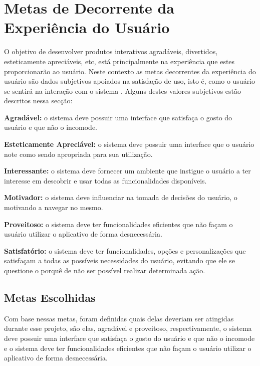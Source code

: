\chapter[Metas Decorrente da Experiência do Usuário]{Metas de Decorrente da Experiência do Usuário}

O objetivo de desenvolver produtos interativos agradáveis, divertidos, esteticamente apreciáveis, etc, está principalmente na experiência que estes proporcionarão ao usuário. Neste contexto as metas decorrentes da experiência do usuário são dados subjetivos apoiados na satisfação de uso,  isto é, como o usuário se sentirá na interação com o sistema \cite{SHROPR}. Alguns destes valores subjetivos estão descritos nessa secção:

\hspace{1.3cm}
\textbf{Agradável:} o sistema deve possuir uma interface que satisfaça o gosto do usuário e que não o incomode.

\hspace{1.3cm}
\textbf{Esteticamente Apreciável:} o sistema deve possuir uma interface que o usuário note como sendo apropriada para sua utilização.

\hspace{1.3cm}
\textbf{Interessante:} o sistema deve fornecer um ambiente que instigue o usuário a ter interesse em descobrir e usar todas as funcionalidades disponíveis.

\hspace{1.3cm}
\textbf{Motivador:} o sistema deve influenciar na tomada de decisões do usuário, o motivando a navegar no mesmo.

\hspace{1.3cm}
\textbf{Proveitoso:} o sistema deve ter funcionalidades eficientes que não façam o usuário utilizar o aplicativo de forma desnecessária.

\hspace{1.3cm}
\textbf{Satisfatório:} o sistema deve ter funcionalidades, opções e personalizações que satisfaçam a todas as possíveis necessidades do usuário, evitando que ele se questione o porquê de não ser possível realizar determinada ação.

\section{Metas Escolhidas}

Com base nessas metas, foram definidas quais delas deveriam ser atingidas durante esse projeto, são elas, agradável e proveitoso, respectivamente, o sistema deve possuir uma interface que satisfaça o gosto do usuário e que não o incomode e o sistema deve ter funcionalidades eficientes que não façam o usuário utilizar o aplicativo de forma desnecessária.